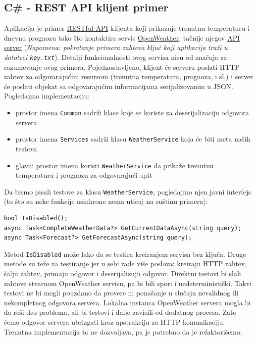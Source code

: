 \subsection{C\# - REST API klijent primer}\label{c---rest-api-klijent-primer}

Aplikacija je primer \href{https://www.redhat.com/en/topics/api/what-is-a-rest-api}{RESTful API} klijenta koji prikazuje trenutnu temperaturu i dnevnu prognozu tako što kontaktira servis \href{https://openweathermap.org/}{OpenWeather}, tačnije njegov \href{https://openweathermap.org/api}{API server} (\emph{Napomena: pokretanje primera zahteva ključ koji aplikacija traži u datoteci \texttt{key.txt}}). Detalji funkcionalnosti ovog servisa nisu od značaja za razumevanje ovog primera. Pojednostavljeno, klijent će serveru poslati HTTP zahtev za odgovarajućim resursom (trenutna temperatura, prognoza, i sl.) i server će poslati objekat sa odgovarajućim informacijama serijalizovanim u JSON. Pogledajmo implementaciju:

\begin{itemize}
\tightlist
\item
  prostor imena \texttt{Common} sadrži klase koje se koriste za deserijalizaciju odgovora servera
\item
  prostor imena \texttt{Services} sadrži klasu \texttt{WeatherService} koja će biti meta naših testova
\item
  glavni prostor imena koristi \texttt{WeatherService} da prikaže trenutnu temperaturu i prognozu za odgovarajući upit
\end{itemize}

Da bismo pisali testove za klasu \texttt{WeatherService}, pogledajmo njen javni interfejs (to što su neke funkcije asinhrone nema uticaj na suštinu primera):

\begin{verbatim}
bool IsDisabled();
async Task<CompleteWeatherData?> GetCurrentDataAsync(string query);
async Task<Forecast?> GetForecastAsync(string query);
\end{verbatim}

Metod \texttt{IsDisabled} može lako da se testira kreiranjem servisa bez ključa. Druge metode su teže za testiranje jer u sebi rade više poslova: kreiraju HTTP zahtev, šalju zahtev, primaju odgovor i deserijalizuju odgovor. Direktni testovi bi slali zahteve stvarnom OpenWeather servisu, pa bi bili spori i nedeterministički. Takvi testovi ne bi mogli pouzdano da provere ni ponašanje u slučaju nevalidnog ili nekompletnog odgovora servera. Lokalna instanca OpenWeather servera mogla bi da reši deo problema, ali bi testovi i dalje zavisili od dodatnog procesa. Zato ćemo odgovor servera ubrizgati kroz apstrakciju za HTTP komunikaciju. Trenutna implementacija to ne dozvoljava, pa je potrebno da je refaktorišemo.

